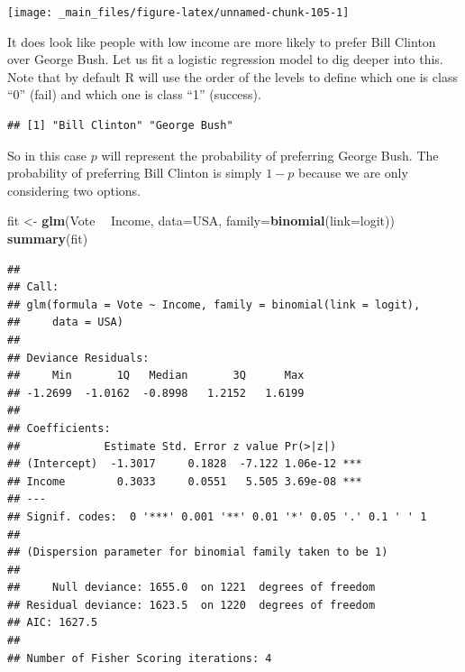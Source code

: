 \documentclass[]{book}
\newenvironment{Shaded}{\begin{snugshade}}{\end{snugshade}}
\newcommand{\KeywordTok}[1]{\textcolor[rgb]{0.13,0.29,0.53}{\textbf{#1}}}
\newcommand{\DataTypeTok}[1]{\textcolor[rgb]{0.13,0.29,0.53}{#1}}
\newcommand{\StringTok}[1]{\textcolor[rgb]{0.31,0.60,0.02}{#1}}
\newcommand{\CommentTok}[1]{\textcolor[rgb]{0.56,0.35,0.01}{\textit{#1}}}
\newcommand{\OperatorTok}[1]{\textcolor[rgb]{0.81,0.36,0.00}{\textbf{#1}}}
\newcommand{\NormalTok}[1]{#1}
\theoremstyle{definition}
\theoremstyle{definition}
\theoremstyle{definition}
\theoremstyle{remark}
\begin{document}
\begin{center}\texttt{[image: \_main\_files/figure-latex/unnamed-chunk-105-1]} \end{center}

It does look like people with low income are more likely to prefer Bill
Clinton over George Bush. Let us fit a logistic regression model to dig
deeper into this. Note that by default R will use the order of the
levels to define which one is class ``0'' (fail) and which one is class
``1'' (success).

\begin{Shaded}
\end{Shaded}

\begin{verbatim}
## [1] "Bill Clinton" "George Bush"
\end{verbatim}

So in this case \(p\) will represent the probability of preferring
George Bush. The probability of preferring Bill Clinton is simply
\(1-p\) because we are only considering two options.

\begin{Shaded}
\begin{Highlighting}[]
\NormalTok{fit <-}\StringTok{ }\KeywordTok{glm}\NormalTok{(Vote }\OperatorTok{~}\StringTok{ }\NormalTok{Income, }\DataTypeTok{data=}\NormalTok{USA, }\DataTypeTok{family=}\KeywordTok{binomial}\NormalTok{(}\DataTypeTok{link=}\NormalTok{logit))}
\KeywordTok{summary}\NormalTok{(fit)}
\end{Highlighting}
\end{Shaded}

\begin{verbatim}
## 
## Call:
## glm(formula = Vote ~ Income, family = binomial(link = logit), 
##     data = USA)
## 
## Deviance Residuals: 
##     Min       1Q   Median       3Q      Max  
## -1.2699  -1.0162  -0.8998   1.2152   1.6199  
## 
## Coefficients:
##             Estimate Std. Error z value Pr(>|z|)    
## (Intercept)  -1.3017     0.1828  -7.122 1.06e-12 ***
## Income        0.3033     0.0551   5.505 3.69e-08 ***
## ---
## Signif. codes:  0 '***' 0.001 '**' 0.01 '*' 0.05 '.' 0.1 ' ' 1
## 
## (Dispersion parameter for binomial family taken to be 1)
## 
##     Null deviance: 1655.0  on 1221  degrees of freedom
## Residual deviance: 1623.5  on 1220  degrees of freedom
## AIC: 1627.5
## 
## Number of Fisher Scoring iterations: 4
\end{verbatim}
\end{document}
